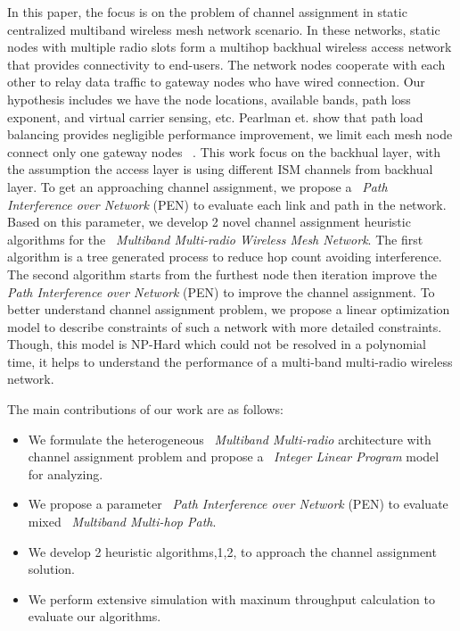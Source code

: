 In this paper, the focus is on the problem of channel assignment in static centralized multiband wireless mesh network scenario. 
In these networks, static nodes with multiple radio slots form a multihop backhual wireless access network that provides connectivity to end-users. The network nodes cooperate with each other to relay data traffic to gateway nodes who have wired connection. 
Our hypothesis includes we have the node locations, available bands, path loss exponent, and virtual carrier sensing, etc. 
Pearlman et. show that path load balancing provides negligible performance improvement, we limit each mesh node connect only one gateway nodes ~\cite{pearlman2000impact}.
This work focus on the backhual layer, with the assumption the access layer is using different ISM channels from backhual layer.
To get an approaching channel assignment, we propose a ~\emph{Path Interference over Network} (PEN) to evaluate each link and path in the network. Based on this parameter, we develop 2 novel channel assignment heuristic algorithms for the ~\emph{Multiband Multi-radio Wireless Mesh Network}. 
The first algorithm is a tree generated process to reduce hop count avoiding interference. The second algorithm starts from the furthest node then iteration improve the \emph{Path Interference over Network} (PEN) to improve the channel assignment.
To better understand channel assignment problem, we propose a linear optimization model to describe constraints of such a network with more detailed constraints. Though, this model is NP-Hard which could not be resolved in a polynomial time, it helps to understand the performance of a multi-band multi-radio wireless network. 

% 
The main contributions of our work are as follows:
\begin{itemize}
\item We formulate the heterogeneous ~\emph{Multiband Multi-radio} architecture with channel assignment problem and propose a ~\emph{Integer Linear Program} model for analyzing.  

\item We propose a  parameter ~\emph{Path Interference over Network} (PEN) to evaluate mixed ~\emph{Multiband Multi-hop Path}.

\item We develop 2 heuristic algorithms,1,2, to approach the channel assignment solution.

\item We perform extensive simulation with maxinum throughput calculation to evaluate our algorithms.


\end{itemize}

